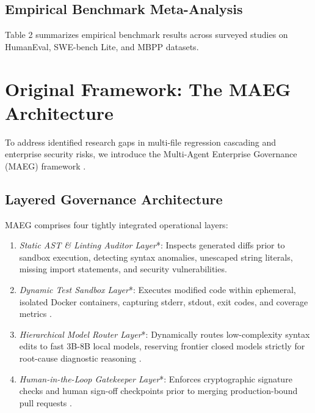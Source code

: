 \documentclass[10pt,journal,compsoc,twocolumn]{IEEEtran}
\begin{document}
\subsection{Empirical Benchmark Meta-Analysis}

Table 2 summarizes empirical benchmark results across surveyed studies on HumanEval, SWE-bench Lite, and MBPP datasets.












\section{Original Framework: The MAEG Architecture}


To address identified research gaps in multi-file regression cascading and enterprise security risks, we introduce the Multi-Agent Enterprise Governance (MAEG) framework \cite{feuerriegel2023generativeai}.


\subsection{Layered Governance Architecture}

MAEG comprises four tightly integrated operational layers:
\begin{enumerate}
  \item \textit{Static AST \& Linting Auditor Layer}*: Inspects generated diffs prior to sandbox execution, detecting syntax anomalies, unescaped string literals, missing import statements, and security vulnerabilities.
  \item \textit{Dynamic Test Sandbox Layer}*: Executes modified code within ephemeral, isolated Docker containers, capturing stderr, stdout, exit codes, and coverage metrics \cite{openalex_w7125699492}.
  \item \textit{Hierarchical Model Router Layer}*: Dynamically routes low-complexity syntax edits to fast 3B-8B local models, reserving frontier closed models strictly for root-cause diagnostic reasoning \cite{openalex_w4414281281}.
  \item \textit{Human-in-the-Loop Gatekeeper Layer}*: Enforces cryptographic signature checks and human sign-off checkpoints prior to merging production-bound pull requests \cite{feuerriegel2023generativeai}.
\end{enumerate}
\end{document}
